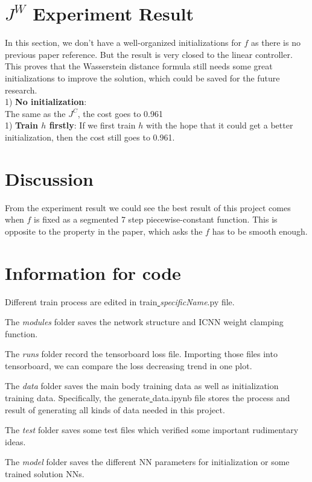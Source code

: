 \documentclass[conference,compsoc]{IEEEtran}
\begin{document}
\section{$J^W$ Experiment Result}
In this section, we don't have a well-organized initializations for $f$ as there is no previous paper reference. But the result is very closed to the linear controller. This proves that the Wasserstein distance formula still needs some great initializations to improve the solution, which could be saved for the future research.\\

1) \textbf{No initialization}:\\
The same as the $J^C$, the cost goes to 0.961\\

1) \textbf{Train $h$ firstly}:
If we first train $h$ with the hope that it could get a better initialization, then the cost still goes to 0.961.

\section{Discussion}
From the experiment result we could see the best result of this project comes when $f$ is fixed as a segmented 7 step piecewise-constant  function. This is opposite to the property in the paper\cite{wu2011witsenhausen}, which asks the $f$ has to be smooth enough.

\section*{Information for code}

Different train process are edited in train\underline{ }\textit{specificName}.py file. 

The \textit{modules} folder saves the network structure and ICNN weight clamping function.

The \textit{runs} folder record the tensorboard loss file. Importing those files into tensorboard, we can compare the loss decreasing trend in one plot.

The \textit{data} folder saves the main body training data as well as initialization training data. Specifically, the generate\underline{ }data.ipynb file stores the process and result of generating all kinds of data needed in this project.

The \textit{test} folder saves some test files which verified some important rudimentary ideas.

The \textit{model} folder saves the different NN parameters for initialization or some trained solution NNs.
\end{document}

